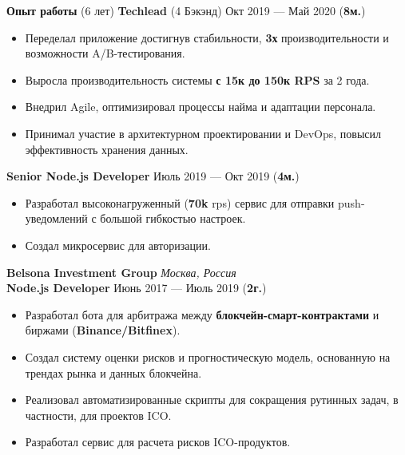 \documentclass{resume}
\begin{document}
\begin{rSection}{\textbf{Опыт работы} (6 лет) }
    \textbf{Techlead} (4 Бэкэнд) \hfill Окт 2019 --- Май 2020 ({\textbf{8м.}})
    \begin{itemize}
        \item Переделал приложение достигнув стабильности, \textbf{3х} производительности и возможности A/B-тестирования\@.
        \item Выросла производительность системы \textbf{с 15к до 150к RPS} за 2 года\@.
        \item Внедрил Agile, оптимизировал процессы найма и адаптации персонала\@.
        \item Принимал участие в архитектурном проектировании и DevOps, повысил эффективность хранения данных\@.
    \end{itemize}

    \textbf{Senior Node.js Developer} \hfill Июль 2019 --- Окт 2019 ({\textbf{4м.}})
    \begin{itemize}
        \item Разработал высоконагруженный (\textbf{70k} rps) сервис для отправки push-уведомлений с большой гибкостью настроек\@.
        \item Создал микросервис для авторизации\@.
    \end{itemize}

    \textbf{Belsona Investment Group} \hfill \textit{Москва, Россия} \\
    \textbf{Node.js Developer}  \hfill Июнь 2017 --- Июль 2019 ({\textbf{2г.}})
    \begin{itemize}
        \item Разработал бота для арбитража между \textbf{блокчейн-смарт-контрактами} и биржами (\textbf{Binance/Bitfinex})\@.
        \item Создал систему оценки рисков и прогностическую модель, основанную на трендах рынка и данных блокчейна\@.
        \item Реализовал автоматизированные скрипты для сокращения рутинных задач, в частности, для проектов ICO\@.
        \item Разработал сервис для расчета рисков ICO-продуктов\@.
    \end{itemize}

\end{rSection}
\end{document}
